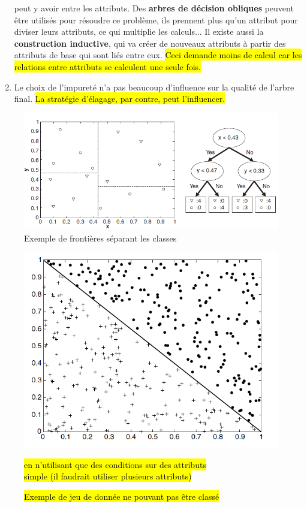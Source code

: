 \documentclass[letterpaper, 12pt]{article}
\begin{document}
\begin{enumerate}
					peut y avoir entre les attributs. Des \textbf{arbres
					de décision obliques} peuvent être utilisés pour 
					résoudre ce problème, ils prennent plus qu'un attribut
					pour diviser leurs attributs, ce qui multiplie les
					calculs... Il existe aussi la \textbf{construction 
					inductive}, qui va créer de nouveaux attributs à partir
					des attributs de base qui sont liés entre eux. \hl{Ceci 
					demande moins de calcul car les relations entre
					attributs se calculent une seule fois.}
				\item Le choix de l'impureté n'a pas beaucoup d'influence
					sur la qualité de l'arbre final. \hl{La stratégie
					d'élagage, par contre, peut l'influencer.}
			\end{enumerate}
			\begin{figure}[H]
				\centering
				\includegraphics[scale=0.75]{Images/tree_boundaries}
				\caption{Exemple de frontières séparant les classes}
				\label{fig:tree:boundaries}
			\end{figure}\noindent
			\begin{figure}[H]
				\centering
				\includegraphics[scale=0.45]{Images/one_rule.PNG}
				\caption{\hl{Exemple de jeu de donnée ne pouvant pas
				être classé}} 
				\hl{en n'utilisant que des conditions sur 
				des attributs\\ simple (il faudrait utiliser plusieurs
				attributs)}
				\label{fig:one_attribute}
			\end{figure}\noindent
\end{document}
